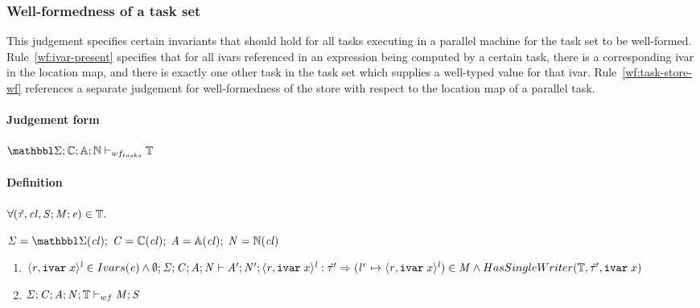 \subsubsection{Well-formedness of a task set}
\label{sec:well-formedness-tasks}

This judgement specifies certain invariants that should hold
for all tasks executing in a parallel machine
for the task set to be well-formed.
%
Rule~\ref{wf:ivar-present} specifies that for all ivars referenced in an
expression being computed by a certain task,
%
there is a corresponding ivar in the location map,
%
and there is exactly one other task in the task set which supplies a
well-typed value for that ivar.
%
Rule~\ref{wf:task-store-wf} references a separate judgement for well-formedness of the
store with respect to the location map of a parallel task.

\paragraph{Judgement form}

$\SENVMAP;\CENVMAP;\AENVMAP;\NENVMAP \storewftasks{\TASKSET}$

\paragraph{Definition}

\paragraph{}

$\forall (\mathit{\hat{\tau}}, \mathit{cl}{}, \mathit{S};\mathit{M};\mathit{e}) \in \mathbb{T}.$

$
\SENV = \SENVMAP(\concretelocvar) ; \;
\CENV = \CENVMAP(\concretelocvar) ; \;
\AENV = \AENVMAP(\concretelocvar) ; \;
\NENV = \NENVMAP(\concretelocvar)
$

\begin{enumerate}
\item \label{wf:ivar-present} $
\langle \mathit{r}, \texttt{ivar}\; x \rangle ^{\mathit{l}} \in Ivars(\mathit{e}) \wedge
 \emptyset;\mathit{\Sigma};\mathit{C};\mathit{A};\mathit{N} \vdash \mathit{A}' ; \mathit{N}' ; \langle \mathit{r}, \texttt{ivar}\; x \rangle ^{\mathit{l}} : \mathit{\hat{\tau}}' \Rightarrow\\
 ({\mathit{l}}^{\mathit{r}} \mapsto \langle \mathit{r}, \texttt{ivar}\; x \rangle ^{\mathit{l}}) \in \mathit{M} \wedge
 HasSingleWriter(\mathbb{T}, \mathit{\hat{\tau}}', \texttt{ivar}\; x)
 $
 

\item \label{wf:task-store-wf} $\mathit{\Sigma};\mathit{C};\mathit{A};\mathit{N};\mathbb{T} \vdash_{wf} \mathit{M};\mathit{S}$
\end{enumerate}

